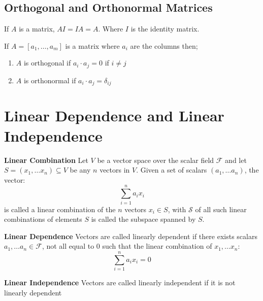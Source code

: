 \subsection{Orthogonal and Orthonormal Matrices}
If $A$ is a matrix, $AI = IA = A$. Where $I$ is the identity matrix. 

If $A = [a_1, \dots, a_m]$ is a matrix where $a_i$ are the columns then;\\
\begin{ddef}
\begin{enumerate}
	\item $A$ is orthogonal if $a_i \cdot a_j = 0$ if $i \neq j$
	\item $A$ is orthonormal if $a_i \cdot a_j = \delta_{ij}$
\end{enumerate}
\end{ddef}

\section{Linear Dependence and Linear Independence}

\begin{ddef}
	\textbf{Linear Combination}
	Let $V$ be a vector space over the scalar field $\mathcal{F}$ and let $S = (x_1, \dots x_n) \subseteq V$ be any $n$ vectors in $V$. Given a set of scalars $(a_1, \dots a_n)$, the vector:
	\begin{equation}
		\sum^n_{i=1} a_ix_i
	\end{equation}
	is called a linear combination of the $n$ vectors $x_i \in S$, with $\mathcal{S}$ of all such linear combinations of elements $S$ is called the subspace spanned by $S$.
\end{ddef} 
\begin{ddef}
	\textbf{Linear Dependence}
	Vectors are called linearly dependent if there exists scalars $a_1, \dots a_n \in \mathcal{F}$, not all equal to $0$ such that the linear combination of $x_1, \dots x_n$:
\begin{equation}
		\sum^n_{i=1} a_ix_i = 0
	\end{equation}
\end{ddef}

\begin{ddef}
	\textbf{Linear Independence}
	Vectors are called linearly independent if it is not linearly dependent
\end{ddef}

